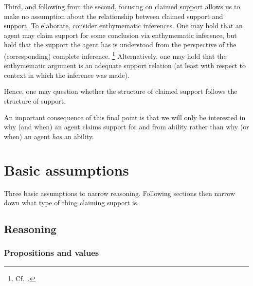 \begin{note}
  Third, and following from the second, focusing on claimed support allows us to make no assumption about the relationship between claimed support and support.
  To elaborate, consider enthymematic inferences.
  One may hold that an agent may claim support for some conclusion via enthymematic inference, but hold that the support the agent has is understood from the perspective of the (corresponding) complete inference.\nolinebreak
  \footnote{
    Cf.\ \textcite{Moretti:2019wx}.
  }
  Alternatively, one may hold that the enthymematic argument is an adequate support relation (at least with respect to context in which the inference was made).

  Hence, one may question whether the structure of claimed support follows the structure of support.

  An important consequence of this final point is that we will only be interested in why (and when) an agent claims support for and from ability rather than why (or when) an agent \emph{has} an ability.
\end{note}

\section{Basic assumptions}
\label{sec:three-basic-assumpt}

\begin{note}
  Three basic assumptions to narrow reasoning.
  Following sections then narrow down what type of thing claiming support is.
\end{note}

\subsection{Reasoning}
\label{sec:reasoning}

\subsubsection{Propositions and values}

